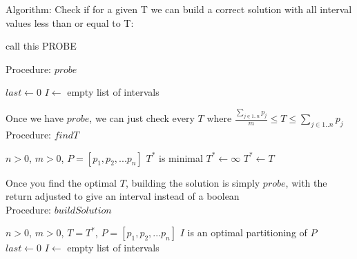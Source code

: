 \documentclass[landscape]{slides}
\begin{document}
\begin{slide}
  Algorithm:
  Check if for a given T we can build a correct solution with all interval
  values less than or equal to T:

  call this PROBE

\end{slide}

\begin{slide}
  Procedure: $probe$

  \begin{algorithm}
    $last \leftarrow 0$
    $I \leftarrow$ empty list of intervals
    \For{$i=1 \rightarrow m$}{

      find $j \ni \sum_{last \leq k < j} p_k \leq T$ and $\sum_{last \leq k \leq j} p_k > T$
      $I[i] \leftarrow [last,j[$
      $last \leftarrow j$

    }
  \end{algorithm}
\end{slide}

\begin{slide}
  Once we have $probe$, we can just check every $T$ where 
  $\frac{\sum_{j \in 1..n} p_j}{m} \leq T \leq \sum_{j \in 1..n} p_j$
  \\Procedure: $findT$
  \begin{algorithmic}
    \REQUIRE $n > 0$, $m > 0$, $P = [p_1, p_2, ... p_n]$
    \ENSURE $T^*$ is minimal
    \STATE $T^* \leftarrow \infty$
        \STATE $T^* \leftarrow T$
      \ENDIF
    \ENDFOR
  \end{algorithmic}
\end{slide}

\begin{slide}
  Once you find the optimal $T$, building the solution is simply $probe$, with
  the return adjusted to give an interval instead of a boolean
  \\Procedure: $buildSolution$
  \begin{algorithmic}
    \REQUIRE $n > 0$, $m > 0$, $T = T^*$, $P = [p_1, p_2, ... p_n]$
    \ENSURE $I$ is an optimal partitioning of $P$
    \STATE $last \leftarrow 0$
    \STATE $I \leftarrow$ empty list of intervals

      \STATE{$I[i] \leftarrow [last,j[$}

    \ENDFOR
  \end{algorithmic}
\end{slide}
\end{document}
